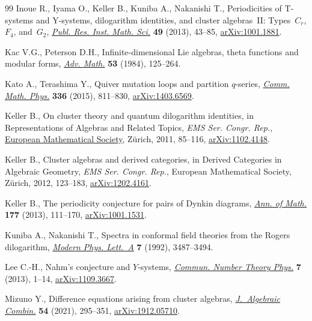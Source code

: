 \documentclass[10pt,a4paper]{amsart}
\numberwithin{equation}{section}
\theoremstyle{definition}
\begin{document}
\begin{thebibliography}{99}
Inoue R., Iyama O., Keller B., Kuniba A., Nakanishi T., Periodicities of
 {T}-systems and {Y}-systems, dilogarithm identities, and cluster
 algebras~{II}: {T}ypes~{$C_r$}, {$F_4$}, and~{$G_2$},
 \href{https://doi.org/10.4171/PRIMS/96}{\textit{Publ. Res. Inst. Math. Sci.}}
 \textbf{49} (2013), 43--85,
 \href{http://arxiv.org/abs/1001.1881}{arXiv:1001.1881}.

Kac V.G., Peterson D.H., Infinite-dimensional {L}ie algebras, theta functions
 and modular forms,
 \href{https://doi.org/10.1016/0001-8708(84)90032-X}{\textit{Adv. Math.}}
 \textbf{53} (1984), 125--264.

Kato A., Terashima Y., Quiver mutation loops and partition {$q$}-series,
 \href{https://doi.org/10.1007/s00220-014-2224-5}{\textit{Comm. Math. Phys.}}
 \textbf{336} (2015), 811--830,
 \href{http://arxiv.org/abs/1403.6569}{arXiv:1403.6569}.

Keller B., On cluster theory and quantum dilogarithm identities, in
 Representations of {A}lgebras and {R}elated {T}opics, \textit{EMS Ser. Congr. Rep.},
 \href{https://doi.org/10.4171/101-1/3}{European Mathematical Society},
 Z\"urich, 2011, 85--116,
 \href{http://arxiv.org/abs/1102.4148}{arXiv:1102.4148}.

Keller B., Cluster algebras and derived categories, in Derived {C}ategories in
 {A}lgebraic {G}eometry, \textit{EMS Ser. Congr. Rep.}, European Mathematical Society,
 Z\"urich, 2012, 123--183,
 \href{http://arxiv.org/abs/1202.4161}{arXiv:1202.4161}.

Keller B., The periodicity conjecture for pairs of {D}ynkin diagrams,
 \href{https://doi.org/10.4007/annals.2013.177.1.3}{\textit{Ann. of Math.}}
 \textbf{177} (2013), 111--170,
 \href{http://arxiv.org/abs/1001.1531}{arXiv:1001.1531}.

Kuniba A., Nakanishi T., Spectra in conformal field theories from the {R}ogers
 dilogarithm, \href{https://doi.org/10.1142/S0217732392002895}{\textit{Modern
 Phys. Lett.~A}} \textbf{7} (1992), 3487--3494.

Lee C.-H., Nahm's conjecture and {$Y$}-systems,
 \href{https://doi.org/10.4310/CNTP.2013.v7.n1.a1}{\textit{Commun. Number
 Theory Phys.}} \textbf{7} (2013), 1--14,
 \href{http://arxiv.org/abs/1109.3667}{arXiv:1109.3667}.

Mizuno Y., Difference equations arising from cluster algebras,
 \href{https://doi.org/10.1007/s10801-020-00978-9}{\textit{J.~Algebraic
 Combin.}} \textbf{54} (2021), 295--351,
 \href{http://arxiv.org/abs/1912.05710}{arXiv:1912.05710}.


\end{thebibliography}
\end{document}
